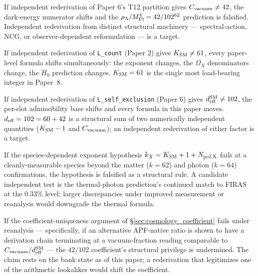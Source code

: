 \documentclass[11pt]{article}
\newcommand{\Mpl}{M_{\rm Pl}}
\begin{document}
\begin{tcolorbox}[defbox, title={(F2) $C_{\rm vacuum}$ rederivation}]
If independent rederivation of Paper 6's T12 partition gives $C_{\rm vacuum} \neq 42$, the dark-energy numerator shifts and the $\rho_\Lambda/\Mpl^4 = 42/102^{62}$ prediction is falsified. Independent rederivation from distinct structural machinery --- spectral-action, NCG, or observer-dependent reformulation --- is a target.
\end{tcolorbox}

\begin{tcolorbox}[defbox, title={(F3) $K_{\rm SM}$ rederivation}]
If independent rederivation of \texttt{L\_count} (Paper 2) gives $K_{\rm SM} \neq 61$, every paper-level formula shifts simultaneously: the exponent changes, the $\Omega_X$ denominators change, the $H_0$ prediction changes. $K_{\rm SM} = 61$ is the single most load-bearing integer in Paper~8.
\end{tcolorbox}

\begin{tcolorbox}[defbox, title={(F4) $d_{\rm eff}$ rederivation}]
If independent rederivation of \texttt{L\_self\_exclusion} (Paper 6) gives $d_{\rm eff}^{\rm SM} \neq 102$, the per-slot admissibility base shifts and every formula in this paper moves. $d_{\rm eff} = 102 = 60 + 42$ is a structural sum of two numerically independent quantities ($K_{\rm SM} - 1$ and $C_{\rm vacuum}$); an independent rederivation of either factor is a target.
\end{tcolorbox}

\begin{tcolorbox}[defbox, title={(F5) CMB temperature and species-dependent exponent}]
If the species-dependent exponent hypothesis $k_X = K_{\rm SM} + 1 + N_{\rm pol,X}$ fails at a cleanly-measurable species beyond the matter ($k=62$) and photon ($k=64$) confirmations, the hypothesis is falsified as a structural rule. A candidate independent test is the thermal-photon prediction's continued match to FIRAS~\cite{Fixsen2009} at the 0.33\% level; larger discrepancies under improved measurement or reanalysis would downgrade the thermal formula.
\end{tcolorbox}

\begin{tcolorbox}[defbox, title={(F6) $42/102$ uniqueness}]
If the coefficient-uniqueness argument of \S\ref{sec:cosmology_coefficient} fails under reanalysis --- specifically, if an alternative APF-native ratio is shown to have a derivation chain terminating at a vacuum-fraction reading comparable to $C_{\rm vacuum}/d_{\rm eff}^{\rm SM}$ --- the $42/102$ coefficient's structural privilege is undermined. The claim rests on the bank state as of this paper; a rederivation that legitimizes one of the arithmetic lookalikes would shift the coefficient.
\end{tcolorbox}
\end{document}
